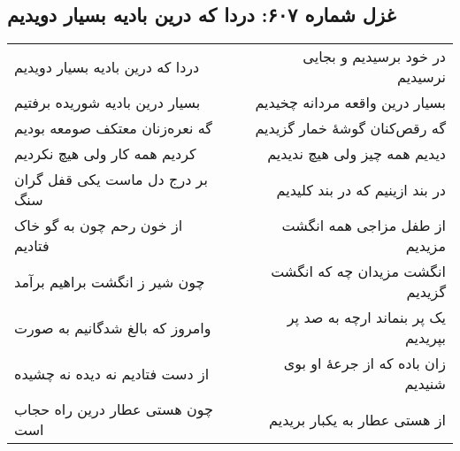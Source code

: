\begin{center}
\section*{غزل شماره ۶۰۷: دردا که درین بادیه بسیار دویدیم}
\label{sec:607}
\begin{longtable}{l p{0.5cm} r}
دردا که درین بادیه بسیار دویدیم
&&
در خود برسیدیم و بجایی نرسیدیم
\\
بسیار درین بادیه شوریده برفتیم
&&
بسیار درین واقعه مردانه چخیدیم
\\
گه نعره‌زنان معتکف صومعه بودیم
&&
گه رقص‌کنان گوشهٔ خمار گزیدیم
\\
کردیم همه کار ولی هیچ نکردیم
&&
دیدیم همه چیز ولی هیچ ندیدیم
\\
بر درج دل ماست یکی قفل گران سنگ
&&
در بند ازینیم که در بند کلیدیم
\\
از خون رحم چون به گو خاک فتادیم
&&
از طفل مزاجی همه انگشت مزیدیم
\\
چون شیر ز انگشت براهیم برآمد
&&
انگشت مزیدان چه که انگشت گزیدیم
\\
وامروز که بالغ شدگانیم به صورت
&&
یک پر بنماند ارچه به صد پر بپریدیم
\\
از دست فتادیم نه دیده نه چشیده
&&
زان باده که از جرعهٔ او بوی شنیدیم
\\
چون هستی عطار درین راه حجاب است
&&
از هستی عطار به یکبار بریدیم
\\
\end{longtable}
\end{center}
